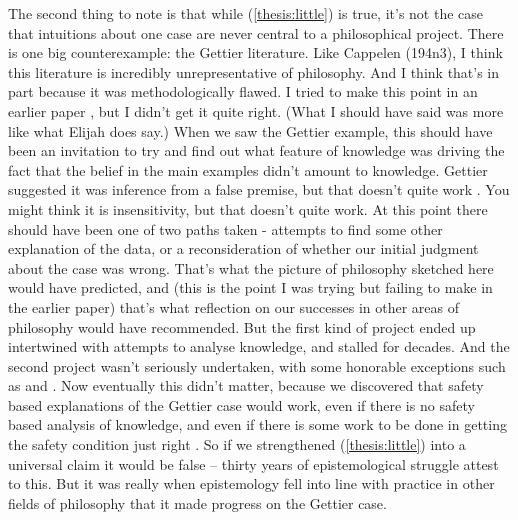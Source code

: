 The second thing to note is that while (\ref{thesis:little}) is true, it's not the case that intuitions about one case are never central to a philosophical project. There is one big counterexample: the Gettier literature. Like Cappelen (194n3), I think this literature is incredibly unrepresentative of philosophy. And I think that's in part because it was methodologically flawed. I tried to make this point in an earlier paper \citep{Weatherson2003-WEAWGA}, but I didn't get it quite right. (What I should have said was more like what Elijah \citet{Chudnoff2011} does say.) When we saw the Gettier example, this should have been an invitation to try and find out what feature of knowledge was driving the fact that the belief in the main examples didn't amount to knowledge. Gettier suggested it was inference from a false premise, but that doesn't quite work \citep{Warfield2005}. You might think it is insensitivity, but that doesn't quite work. At this point there should have been one of two paths taken - attempts to find some other explanation of the data, or a reconsideration of whether our initial judgment about the case was wrong. That's what the picture of philosophy sketched here would have predicted, and (this is the point I was trying but failing to make in the earlier paper) that's what reflection on our successes in other areas of philosophy would have recommended. But the first kind of project ended up intertwined with attempts to analyse knowledge, and stalled for decades. And the second project wasn't seriously undertaken, with some honorable exceptions such as \citet{Sartwell1992} and \citet{Hetherington2001}. Now eventually this didn't matter, because we discovered that safety based explanations of the Gettier case would work, even if there is no safety based analysis of knowledge, and even if there is some work to be done in getting the safety condition just right \citep{Williamson1994-WILV, Williamson2000-WILKAI, Sainsbury1996, Lewis1996b, Weatherson2004-WEALMT}. So if we strengthened (\ref{thesis:little}) into a universal claim it would be false -- thirty years of epistemological struggle attest to this. But it was really when epistemology fell into line with practice in other fields of philosophy that it made progress on the Gettier case.
